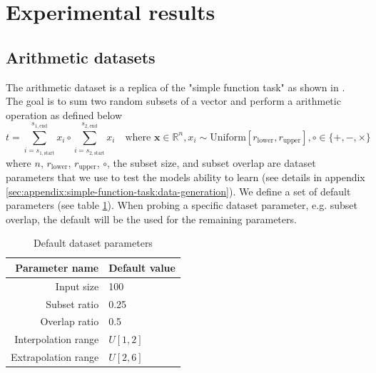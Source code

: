 \section{Experimental results}
\label{sec:experiments}

\subsection{Arithmetic datasets}

The arithmetic dataset is a replica of the "simple function task" as shown in \cite{trask-nalu}.
The goal is to sum two random subsets of a vector and perform a arithmetic operation as defined below
\begin{equation}
t = \sum_{i = s_{1,\mathrm{start}}}^{s_{1,\mathrm{end}}} x_i \circ \sum_{i = s_{2,\mathrm{start}}}^{s_{2,\mathrm{end}}} x_i \quad \text{where } \mathbf{x} \in \mathbb{R}^n, x_i \sim \mathrm{Uniform}[r_{\mathrm{lower}}, r_{\mathrm{upper}}], \circ \in \{+, -, \times\}
\label{eq:arithmetic-problem}
\end{equation}
where $n$, $r_{\mathrm{lower}}$, $r_{\mathrm{upper}}$, $\circ$, the subset size, and subset overlap are dataset parameters that we use to test the models ability to learn (see details in appendix \ref{sec:appendix:simple-function-task:data-generation}).
We define a set of default parameters (see table \ref{tab:simple-function-task-defaults}).
When probing a specific dataset parameter, e.g. subset overlap, the default will be the used for the remaining parameters.
\begin{table}[h]
\caption{Default dataset parameters}
\label{tab:simple-function-task-defaults}
\centering
\begin{tabular}{r l}
\toprule
 Parameter name & Default value \\
 \midrule
 Input size & 100 \\
 Subset ratio & 0.25 \\
 Overlap ratio & 0.5 \\
 Interpolation range & $U[1,2]$ \\
 Extrapolation range & $U[2,6]$ \\
 \bottomrule
\end{tabular}
\end{table}

